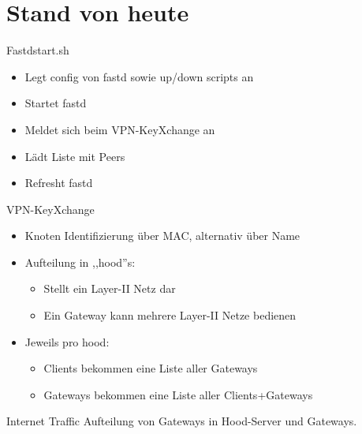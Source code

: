 \section{Stand von heute}

\begin{frame}{Fastdstart.sh}
    \begin{itemize}
        \item Legt config von fastd sowie up/down scripts an
        \item Startet fastd
        \item Meldet sich beim VPN-KeyXchange an
        \item Lädt Liste mit Peers
        \item Refresht fastd
    \end{itemize}
\end{frame}

\begin{frame}{VPN-KeyXchange}
    \begin{itemize}
        \item Knoten Identifizierung über MAC, alternativ über Name
        \item Aufteilung in ,,hood''s:
        \begin{itemize}
            \item Stellt ein Layer-II Netz dar
            \item Ein Gateway kann mehrere Layer-II Netze bedienen
        \end{itemize}
        \item Jeweils pro hood:
        \begin{itemize}
            \item Clients bekommen eine Liste aller Gateways
            \item Gateways bekommen eine Liste aller Clients+Gateways
        \end{itemize}
    \end{itemize}
\end{frame}

\begin{frame}{Internet Traffic}
    Aufteilung von Gateways in Hood-Server und Gateways.
\end{frame}

